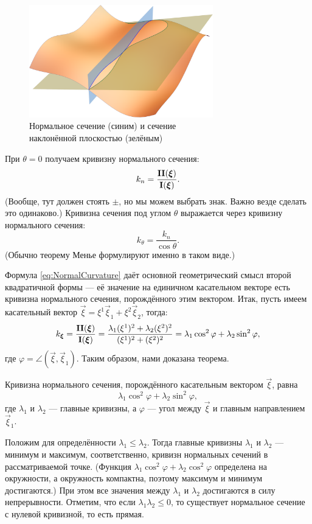 \begin{figure}[H]
	\centering
	\includegraphics[width=8cm]{./img/ThetaSection.pdf}
	\caption{Нормальное сечение (синим) и сечение\\ наклонённой плоскостью (зелёным)}
\end{figure}

\noindent%
При $\theta = 0$ получаем кривизну нормального сечения:
\begin{equation} \label{eq:NormalCurvature}
	k_n = \frac{\boldsymbol{\operatorname{II}}(\boldsymbol{\xi})}{\boldsymbol{\operatorname{I}}(\boldsymbol{\xi})}.
\end{equation}
(Вообще, тут должен стоять $\pm$, но мы можем выбрать знак. Важно везде сделать это одинаково.) Кривизна сечения под углом $\theta$ выражается через кривизну нормального сечения:
\[
	k_{\theta} = \frac{k_n}{\cos\theta}.
\]
(Обычно теорему Менье формулируют именно в таком виде.)

Формула \ref{eq:NormalCurvature} даёт основной геометрический смысл второй квадратичной формы --- её значение на единичном касательном векторе есть кривизна нормального сечения, порождённого этим вектором. Итак, пусть имеем касательный вектор $\vec{\xi} = \xi^1\vec{\xi}_1 + \xi^2\vec{\xi}_2$, тогда:
\[
	k_{\boldsymbol{\xi}} = \frac{\boldsymbol{\operatorname{II}}(\boldsymbol{\xi})}{\boldsymbol{\operatorname{I}}(\boldsymbol{\xi})} = \frac{\lambda_1(\xi^1)^2 + \lambda_2(\xi^2)^2}{(\xi^1)^2 + (\xi^2)^2} = \lambda_1\cos^2\varphi + \lambda_2\sin^2\varphi,
\]
где $\varphi = \angle(\vec{\xi}, \vec{\xi}_1)$. Таким образом, нами доказана теорема.

\begin{theorem} \label{theorem:EulerFormula}
	Кривизна нормального сечения, порождённого касательным вектором $\vec{\xi}$, равна
	\[
		\lambda_1\cos^2\varphi + \lambda_2\sin^2\varphi,
	\]
	где $\lambda_1$ и $\lambda_2$ --- главные кривизны, а $\varphi$ --- угол между $\vec{\xi}$ и главным направлением $\vec{\xi}_1$.
\end{theorem}

Положим для определённости $\lambda_1 \leqslant \lambda_2$. Тогда главные кривизны $\lambda_1$ и $\lambda_2$ --- минимум и максимум, соответственно, кривизн нормальных сечений в рассматриваемой точке. (Функция $\lambda_1\cos^2\varphi + \lambda_2\cos^2\varphi$ определена на окружности, а окружность компактна, поэтому максимум и минимум достигаются.) При этом все значения между $\lambda_1$ и $\lambda_2$ достигаются в силу непрерывности. Отметим, что если $\lambda_1\lambda_2 \leqslant 0$, то существует нормальное сечение с нулевой кривизной, то есть прямая.

